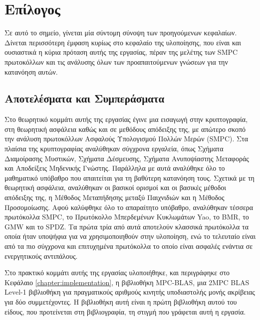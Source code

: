 \chapter{Επίλογος}
\label{chapter:postamble}

Σε αυτό το σημείο, γίνεται μία σύντομη σύνοψη των προηγούμενων κεφαλαίων. Δίνεται περισσότερη έμφαση κυρίως στο κεφαλαίο της υλοποίησης, που είναι και ουσιαστικά η κύρια πρόταση αυτής της εργασίας, πέραν της μελέτης των SMPC πρωτοκόλλων και τις ανάλυσης όλων των προαπαιτούμενων γνώσεων για την κατανόηση αυτών.

\section{Αποτελέσματα και Συμπεράσματα}

Στο θεωρητικό κομμάτι αυτής της εργασίας έγινε μια εισαγωγή στην κρυπτογραφία, στη θεωρητική ασφάλεια καθώς και σε μεθόδους απόδειξης της, με απώτερο σκοπό την ανάλυση πρωτοκόλλων Ασφαλούς Υπολογισμού Πολλών Μερών (SMPC). Στα πλαίσια της κρυπτογραφίας αναλύθηκαν σύγχρονα εργαλεία, όπως Σχήματα Διαμοίρασης Μυστικών, Σχήματα Δέσμευσης, Σχήματα Ανυποψίαστης Μεταφοράς και Αποδείξεις Μηδενικής Γνώστης. Παράλληλα με αυτά αναλύθηκε όλο το μαθηματικό υπόβαθρο που απαιτείται για τη βαθύτερη κατανόηση τους. Σχετικά με τη θεωρητική ασφάλεια, αναλύθηκαν οι βασικοί ορισμοί και οι βασικές μέθοδοι απόδειξης της, η Μέθοδος Μεταπήδησης μεταξύ Παιχνιδιών και η Μέθοδος Προσομοίωσης. Αφού καλύφθηκε όλο το απαραίτητο υπόβαθρο, αναλύθηκαν τέσσερα πρωτόκολλα SMPC, το Πρωτόκολλο Μπερδεμένων Κυκλωμάτων Yao, το BMR, το GMW και το SPDZ. Τα πρώτα τρία από αυτά αποτελούν κλασσικά πρωτόκολλα τα οποία ήταν υποψήφια για να χρησιμοποιηθούν στην υλοποίηση, ενώ το τελευταίο είναι από τα πιο σύγχρονα και επιτυχημένα πρωτόκολλα το οποίο είναι ασφαλές ενάντια σε ενεργητικούς αντιπάλους.

Στο πρακτικό κομμάτι αυτής της εργασίας υλοποιήθηκε, και περιγράφηκε στο Κεφάλαιο \ref{chapter:implementation}, η βιβλιοθήκη MPC-BLAS, μια 2MPC BLAS Level-1 βιβλιοθήκη για πραγματικούς αριθμούς κινητής υποδιαστολής μονής ακρίβειας για δύο συμμετέχοντες. Η βιβλιοθήκη αυτή είναι η πρώτη βιβλιοθήκη αυτού του είδους, που προτείνεται στη βιβλιογραφία, τη στιγμή που γράφεται αυτή η εργασία.


